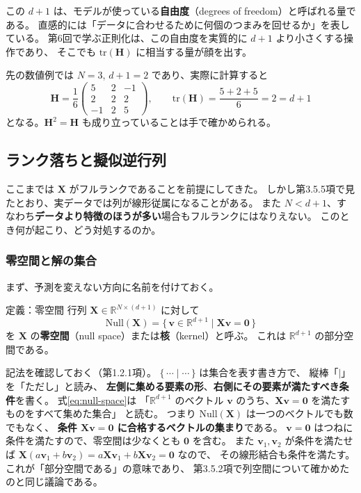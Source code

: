 この $d+1$ は、モデルが使っている\textbf{自由度}（degrees of freedom）と呼ばれる量である。
直感的には「データに合わせるために何個のつまみを回せるか」を表している。
第6回で学ぶ正則化は、この自由度を実質的に $d+1$ より小さくする操作であり、
そこでも $\mathrm{tr}(\bm{H})$ に相当する量が顔を出す。

先の数値例では $N = 3$, $d+1 = 2$ であり、実際に計算すると
\begin{equation*}
  \bm{H} = \frac{1}{6}\begin{pmatrix} 5 & 2 & -1 \\ 2 & 2 & 2 \\ -1 & 2 & 5 \end{pmatrix},
  \qquad \mathrm{tr}(\bm{H}) = \frac{5 + 2 + 5}{6} = 2 = d+1
\end{equation*}
となる。$\bm{H}^2 = \bm{H}$ も成り立っていることは手で確かめられる。


\subsection{ランク落ちと擬似逆行列}

ここまでは $\bm{X}$ がフルランクであることを前提にしてきた。
しかし第3.5.5項で見たとおり、実データでは列が線形従属になることがある。
また $N < d+1$、すなわち\textbf{データより特徴のほうが多い}場合もフルランクにはなりえない。
このとき何が起こり、どう対処するのか。

\subsubsection{零空間と解の集合}

まず、予測を変えない方向に名前を付けておく。

\begin{itembox}[l]{定義：零空間}
行列 $\bm{X} \in \mathbb{R}^{N \times (d+1)}$ に対して
\begin{equation}
  \mathrm{Null}(\bm{X}) = \{\, \bm{v} \in \mathbb{R}^{d+1} \mid \bm{X}\bm{v} = \bm{0} \,\}
  \label{eq:null-space}
\end{equation}
を $\bm{X}$ の\textbf{零空間}（null space）または\textbf{核}（kernel）と呼ぶ。
これは $\mathbb{R}^{d+1}$ の部分空間である。
\end{itembox}

記法を確認しておく（第1.2.1項）。
$\{\, \cdots \mid \cdots \,\}$ は集合を表す書き方で、
縦棒「$\mid$」を「ただし」と読み、
\textbf{左側に集める要素の形}、\textbf{右側にその要素が満たすべき条件}を書く。
式\eqref{eq:null-space}は
「$\mathbb{R}^{d+1}$ のベクトル $\bm{v}$ のうち、$\bm{X}\bm{v} = \bm{0}$ を満たすものをすべて集めた集合」
と読む。
つまり $\mathrm{Null}(\bm{X})$ は一つのベクトルでも数でもなく、
\textbf{条件 $\bm{X}\bm{v} = \bm{0}$ に合格するベクトルの集まり}である。
$\bm{v} = \bm{0}$ はつねに条件を満たすので、零空間は少なくとも $\bm{0}$ を含む。
また $\bm{v}_1, \bm{v}_2$ が条件を満たせば
$\bm{X}(a\bm{v}_1 + b\bm{v}_2) = a\bm{X}\bm{v}_1 + b\bm{X}\bm{v}_2 = \bm{0}$ なので、
その線形結合も条件を満たす。これが「部分空間である」の意味であり、
第3.5.2項で列空間について確かめたのと同じ議論である。

